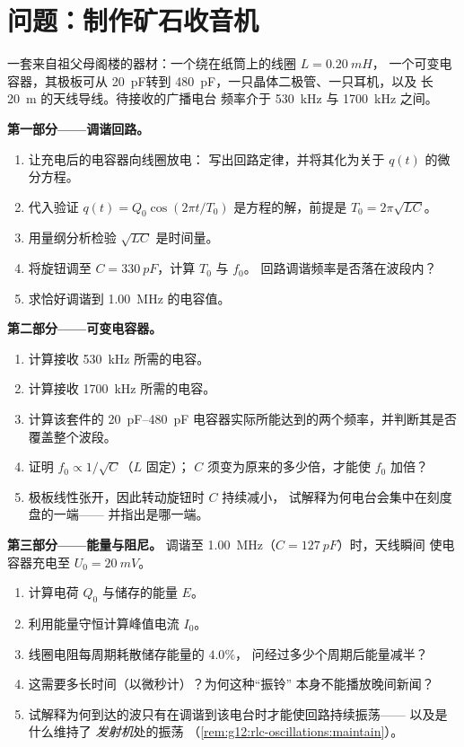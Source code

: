 \section{问题：制作矿石收音机}

\begin{problem}
\label{pb:g12:rlc-oscillations:1}
一套来自祖父母阁楼的器材：一个绕在纸筒上的线圈 $L = \qty{0.20}{mH}$，
一个可变电容器，其极板可从
\qty{20}{pF}转到 \qty{480}{pF}，一只晶体二极管、一只耳机，以及
长 \qty{20}{m} 的天线导线。待接收的广播电台
频率介于 \qty{530}{kHz} 与 \qty{1700}{kHz} 之间。

\medskip
\noindent\textbf{第一部分——调谐回路。}
\begin{enumerate}
  \item 让充电后的电容器向线圈放电：
        写出回路定律，并将其化为关于
        $q(t)$ 的微分方程。
  \item 代入验证 $q(t) = Q_0\cos(2\pi t/T_0)$
        是方程的解，前提是 $T_0 = 2\pi\sqrt{LC}$。
  \item 用量纲分析检验 $\sqrt{LC}$ 是时间量。
  \item 将旋钮调至 $C = \qty{330}{pF}$，计算 $T_0$ 与 $f_0$。
        回路调谐频率是否落在波段内？
  \item 求恰好调谐到 \qty{1.00}{MHz} 的电容值。
\end{enumerate}

\medskip
\noindent\textbf{第二部分——可变电容器。}
\begin{enumerate}[resume]
  \item 计算接收 \qty{530}{kHz} 所需的电容。
  \item 计算接收 \qty{1700}{kHz} 所需的电容。
  \item 计算该套件的 \qtyrange{20}{480}{pF}
        电容器实际所能达到的两个频率，并判断其是否覆盖整个波段。
  \item 证明 $f_0 \propto 1/\sqrt{C}$（$L$ 固定）；
        $C$ 须变为原来的多少倍，才能使 $f_0$ 加倍？
  \item 极板线性张开，因此转动旋钮时 $C$ 持续减小，
        试解释为何电台会集中在刻度盘的一端——
        并指出是哪一端。
\end{enumerate}

\medskip
\noindent\textbf{第三部分——能量与阻尼。}
调谐至 \qty{1.00}{MHz}（$C = \qty{127}{pF}$）时，天线瞬间
使电容器充电至 $U_0 = \qty{20}{mV}$。
\begin{enumerate}[resume]
  \item 计算电荷 $Q_0$ 与储存的能量 $E$。
  \item 利用能量守恒计算峰值电流 $I_0$。
  \item 线圈电阻每周期耗散储存能量的 $4.0\%$，
        问经过多少个周期后能量减半？
  \item 这需要多长时间（以微秒计）？为何这种“振铃”
        本身不能播放晚间新闻？
  \item 试解释为何到达的波只有在调谐到该电台时才能使回路持续振荡——
        以及是什么维持了
        \emph{发射机}处的振荡
        （\cref{rem:g12:rlc-oscillations:maintain}）。
\end{enumerate}


\end{problem}
